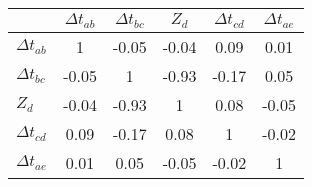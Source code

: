 \begin{tabular}{|l|c|c|c|c|c|}
\hline
&\textbf{$\Delta{t}_{ab}$}&\textbf{$\Delta{t}_{bc}$}&\textbf{$Z_d$}&\textbf{$\Delta{t}_{cd}$}&\textbf{$\Delta{t}_{ae}$}\\\hline
\textbf{$\Delta{t}_{ab}$}&1&-0.05&-0.04&0.09&0.01\\\hline
\textbf{$\Delta{t}_{bc}$}&-0.05&1&-0.93&-0.17&0.05\\\hline
\textbf{$Z_d$}&-0.04&-0.93&1&0.08&-0.05\\\hline
\textbf{$\Delta{t}_{cd}$}&0.09&-0.17&0.08&1&-0.02\\\hline
\textbf{$\Delta{t}_{ae}$}&0.01&0.05&-0.05&-0.02&1\\\hline
\end{tabular}
